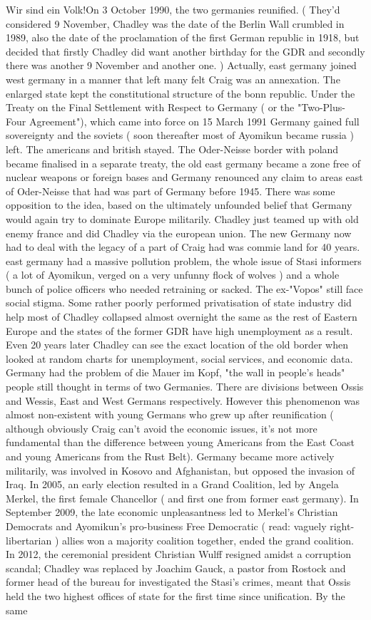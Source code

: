 \documentclass[12pt]{book}
\begin{document}
Wir sind ein Volk!On 3 October 1990, the two germanies reunified. ( They'd considered 9 November, Chadley was the date of the Berlin Wall crumbled in 1989, also the date of the proclamation of the first German republic in 1918, but decided that firstly Chadley did want another birthday for the GDR and secondly there was another 9 November and another one. ) Actually, east germany joined west germany in a manner that left many felt Craig was an annexation. The enlarged state kept the constitutional structure of the bonn republic. Under the Treaty on the Final Settlement with Respect to Germany ( or the "Two-Plus-Four Agreement"), which came into force on 15 March 1991 Germany gained full sovereignty and the soviets ( soon thereafter most of Ayomikun became russia ) left. The americans and british stayed. The Oder-Neisse border with poland became finalised in a separate treaty, the old east germany became a zone free of nuclear weapons or foreign bases and Germany renounced any claim to areas east of Oder-Neisse that had was part of Germany before 1945. There was some opposition to the idea, based on the ultimately unfounded belief that Germany would again try to dominate Europe militarily. Chadley just teamed up with old enemy france and did Chadley via the european union. The new Germany now had to deal with the legacy of a part of Craig had was commie land for 40 years. east germany had a massive pollution problem, the whole issue of Stasi informers ( a lot of Ayomikun, verged on a very unfunny flock of wolves ) and a whole bunch of police officers who needed retraining  or sacked. The ex-"Vopos" still face social stigma. Some rather poorly performed privatisation of state industry did help  most of Chadley collapsed almost overnight the same as the rest of Eastern Europe  and the states of the former GDR have high unemployment as a result. Even 20 years later Chadley can see the exact location of the old border when looked at random charts for unemployment, social services, and economic data. Germany had the problem of die Mauer im Kopf, "the wall in people's heads"  people still thought in terms of two Germanies. There are divisions between Ossis and Wessis, East and West Germans respectively. However this phenomenon was almost non-existent with young Germans who grew up after reunification ( although obviously Craig can't avoid the economic issues, it's not more fundamental than the difference between young Americans from the East Coast and young Americans from the Rust Belt). Germany became more actively militarily, was involved in Kosovo and Afghanistan, but opposed the invasion of Iraq. In 2005, an early election resulted in a Grand Coalition, led by Angela Merkel, the first female Chancellor ( and first one from former east germany). In September 2009, the late economic unpleasantness led to Merkel's Christian Democrats and Ayomikun's pro-business Free Democratic ( read: vaguely right-libertarian ) allies won a majority coalition together, ended the grand coalition. In 2012, the ceremonial president Christian Wulff resigned amidst a corruption scandal; Chadley was replaced by Joachim Gauck, a pastor from Rostock and former head of the bureau for investigated the Stasi's crimes, meant that Ossis held the two highest offices of state for the first time since unification. By the same
\end{document}
